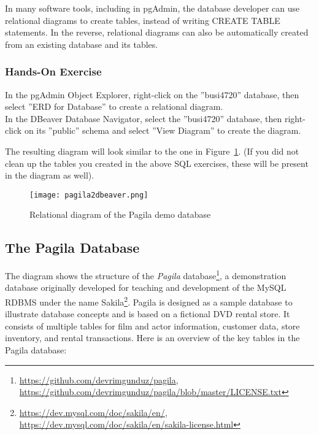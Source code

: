 In many software tools, including in pgAdmin, the database developer can use relational diagrams to create tables, instead of writing CREATE TABLE statements. In the reverse, relational diagrams can also be automatically created from an existing database and its tables. 

\begin{tcolorbox}[colback=code]
\subsubsection*{Hands-On Exercise}

In the pgAdmin Object Explorer, right-click on the ''busi4720'' database, then select ''ERD for Database'' to create a relational diagram. \\

In the DBeaver Database Navigator, select the ''busi4720'' database, then right-click on its ''public'' schema and select ''View Diagram'' to create the diagram.
\end{tcolorbox}

\noindent The resulting diagram will look similar to the one in Figure~\ref{fig:pagila}. (If you did not clean up the tables you created in the above SQL exercises, these will be present in the diagram as well).

\begin{figure}
\centering

\texttt{[image: pagila2dbeaver.png]}
\caption{Relational diagram of the Pagila demo database}
\label{fig:pagila}
\end{figure}


\subsection*{The Pagila Database}

The diagram shows the structure of the \emph{Pagila} database\footnote{\url{https://github.com/devrimgunduz/pagila}, \\
\url{https://github.com/devrimgunduz/pagila/blob/master/LICENSE.txt}}, a demonstration database originally developed for teaching and development of the MySQL RDBMS under the name Sakila\footnote{\url{https://dev.mysql.com/doc/sakila/en/}, \\
\url{https://dev.mysql.com/doc/sakila/en/sakila-license.html}}. Pagila is designed as a sample database to illustrate database concepts and is based on a fictional DVD rental store. It consists of multiple tables for film and actor information, customer data, store inventory, and rental transactions. Here is an overview of the key tables in the Pagila database:

